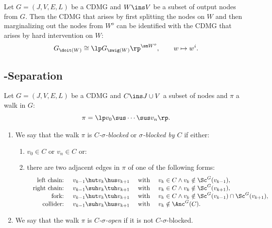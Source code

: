\begin{Lem}
     Let $G=(J,V,E,L)$ be a CDMG and $W \ins V$ be a subset of output nodes from $G$.
     Then the CDMG that arises by first splitting the nodes on $W$ 
      and then marginalizing out the nodes from $W^o$ 
     can be identified with the CDMG that arises by hard intervention on $W$:
     \[ G_{\doit(W)} \cong \lp G_{\swig(W)}\rp^{\sm W^o}, \qquad w \mapsto w^i. \]
\end{Lem}

\subsection{\textsigma-Separation}

\begin{Def}\label{def:sigma_blocking}
      Let $G=(J,V,E,L)$ be a CDMG and $C \ins J \cup V$ a subset of nodes and $\pi$ a walk in $G$:
      \[ \pi =\lp  v_0 \sus \cdots \sus v_n \rp.  \]
      \begin{enumerate}
          \item
      We say that the walk $\pi$ is \emph{$C$-$\sigma$-blocked} or \emph{$\sigma$-blocked by $C$} if either:
      \begin{enumerate}[label=\roman*.)]
          \item $v_0 \in C$ or $v_n \in C$ or:
          \item there are two adjacent edges in $\pi$ of one of the following forms:
              \[\begin{array}{rccl}
  \text{ left chain: } & v_{k-1} \hut v_k \hus v_{k+1} & \text{ with } & v_k \in C \land v_k \notin \Sc^G(v_{k-1}),\\
  \text{ right chain: } & v_{k-1} \suh v_k \tuh v_{k+1} & \text{ with } & v_k \in C \land v_k \notin \Sc^G(v_{k+1}),\\
  \text{ fork: } & v_{k-1} \hut v_k \tuh v_{k+1} & \text{ with } & v_k \in C \land v_k \notin \Sc^G(v_{k-1}) \cap \Sc^G(v_{k+1}),\\
  \text{ collider: } & v_{k-1} \suh v_k \hus v_{k+1} & \text{ with } & v_k \notin \Anc^G(C).
              \end{array}\]
      \end{enumerate}
  \item We say that the walk $\pi$ is \emph{$C$-$\sigma$-open} if it is not $C$-$\sigma$-blocked.
  \end{enumerate}
\end{Def}

